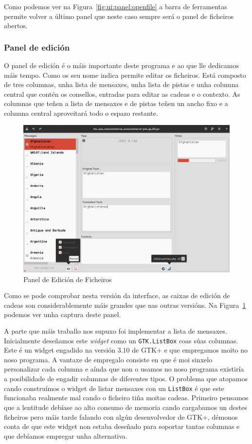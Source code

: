 Como podemos ver na Figura~\ref{fig:ui:panel:openfile} a barra de ferramentas permite volver a último panel que neste caso sempre será o panel de ficheiros abertos.

\subsubsection{Panel de edición}

O panel de edición é o máis importante deste programa e ao que lle dedicamos máis tempo. Como os seu nome indica permite editar os ficheiros. Está composto de tres columnas, unha lista de mensaxes, unha lista de pistas e unha columna central que contén os consellos, entradas para editar as cadeas e o contexto. As columnas que teñen a lista de mensaxes e de pistas teñen un ancho fixo e a columna central aproveitará todo o espazo restante.

\begin{figure}[hp!]
    \centering
    \includegraphics[angle=90,width=\textwidth]{img/panel_edicion.png}
    \caption{Panel de Edición de Ficheiros}
    \label{fig:ui:panel:edit}
\end{figure}

Como se pode comprobar nesta versión da interface, as caixas de edición de cadeas son considerablemente máis grandes que nas outras versións. Na Figura~\ref{fig:ui:panel:edit} podemos ver unha captura deste panel.

A parte que máis traballo nos supuxo foi implementar a lista de mensaxes. Inicialmente deseñamos este \emph{widget} como un \lstinline{GTK.ListBox} coas súas columnas. Este é un widget engadido na versión 3.10 de GTK+ e que empregamos moito no noso programa. A vantaxe de empregalo consiste en que é moi sinxelo personalizar cada columna e aínda que non o usamos no noso programa existiría a posibilidade de engadir columnas de diferentes tipos. O problema que atopamos cando construímos o widget de listar mensaxes con un \lstinline{ListBox} é que este funcionaba realmente mal cando o ficheiro tiña moitas cadeas. Primeiro pensamos que a lentitude debíase ao alto consumo de memoria cando cargabamos un destes ficheiros pero máis tarde falando con algún desenvolvedor de GTK+, démonos conta de que este widget non estaba deseñado para soportar tantas columnas e que debíamos empregar unha alternativa.

